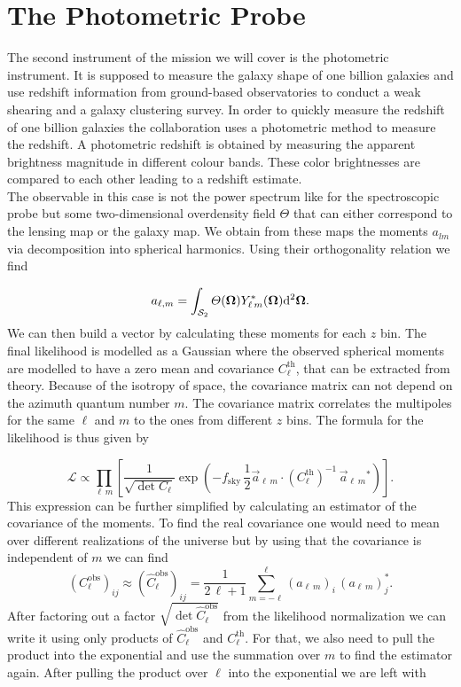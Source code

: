 \documentclass[../main.tex]{subfiles}
\begin{document}
\chapter{The Photometric Probe}
The second instrument of the \Euclid mission we will cover is the photometric instrument. It is supposed to measure the galaxy shape of one billion galaxies and use redshift information from ground-based observatories to conduct a weak shearing and a galaxy clustering survey. In order to quickly measure the redshift of one billion galaxies the collaboration uses a photometric method to measure the redshift. A photometric redshift is obtained by measuring the apparent brightness magnitude in different colour bands. These color brightnesses are compared to each other leading to a redshift estimate.\\
The observable in this case is not the power spectrum like for the spectroscopic probe but some two-dimensional overdensity field $\varTheta$ that can either correspond to the lensing map or the galaxy map. We obtain from these maps the moments $a_{lm}$ via decomposition into spherical harmonics. Using their orthogonality relation we find 

\begin{equation}
    a_{\ell, m} = \int_{\mathcal{S}_2} \varTheta(\boldsymbol{\Omega}) Y_{\ell\,m}^*(\boldsymbol{\Omega}) \mathrm{d}^2 \boldsymbol{\boldsymbol{\Omega}}.
\end{equation}
We can then build a vector by calculating these moments for each $z$ bin. The final likelihood is modelled as a Gaussian where the observed spherical moments are modelled to have a zero mean and covariance $C^\mathrm{th}_\ell$, that can be extracted from theory. Because of the isotropy of space, the covariance matrix can not depend on the azimuth quantum number $m$. The covariance matrix correlates the multipoles for the same $\ell$ and $m$ to the ones from different $z$ bins. The formula for the likelihood is thus given by 

\begin{equation}
    \mathcal{L} \propto \prod_{\ell\,m} \left[\frac{1}{\sqrt{\det C_\ell}} \exp\left(-f_\mathrm{sky}\, \frac{1}{2}\vec{a}_{\ell\,m} \cdot \left(C_\ell^\mathrm{th}\right)^{-1}\,\vec{a}_{\ell\,m}^{}\!^*\right) \right].
\end{equation}
This expression can be further simplified by calculating an estimator of the covariance of the moments. To find the real covariance one would need to mean over different realizations of the universe but by using that the covariance is independent of $m$ we can find \begin{equation}
    \left(C^\mathrm{obs}_\ell\right)_{ij} \approx  \left(\hat{C}^\mathrm{obs}_\ell\right)_{ij} = \frac{1}{2\,\ell+1} \sum_{m=-\ell}^{\ell} \left(a_{\ell\,m}\right)_i \, \left(a_{\ell\,m}\right)_j^*.
\end{equation}
After factoring out a factor $\sqrt{\det \hat{C}^\mathrm{obs}_\ell}$ from the likelihood normalization we can write it using only products of $\hat{C}_\ell^\mathrm{obs}$ and $C_\ell^\mathrm{th}$. For that, we also need to pull the product into the exponential and use the summation over $m$ to find the estimator again. After pulling the product over $\ell$ into the exponential we are left with 
\end{document}
